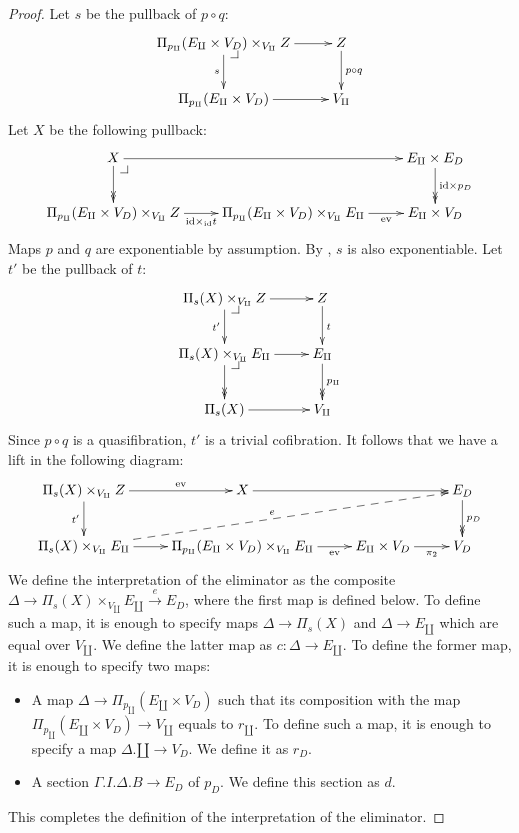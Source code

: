 \documentclass[reqno]{amsart}
\makeatletter
\theoremstyle{definition}
\theoremstyle{remark}
\newcommand{\fs}[1]{\mathrm{#1}}
\newcommand{\id}{\fs{id}}
\numberwithin{figure}{section}
\newcommand{\pb}[1][dr]{\save*!/#1-1.2pc/#1:(-1,1)@^{|-}\restore}
\makeatother
\begin{document}
\begin{proof}
Let $s$ be the pullback of $p \circ q$:
\[ \xymatrix{ \Pi_{p_\amalg}(E_\amalg \times V_D) \times_{V_\amalg} Z \ar[r] \ar[d]_s \pb   & Z \ar[d]^{p \circ q} \\
              \Pi_{p_\amalg}(E_\amalg \times V_D) \ar[r]                                    & V_\amalg
            } \]
Let $X$ be the following pullback:
\[ \xymatrix{ X \ar[rr] \ar@{->>}[d] \pb                                                            &                                                                                   & E_\amalg \times E_D \ar@{->>}[d]^{\id \times p_D} \\
              \Pi_{p_\amalg}(E_\amalg \times V_D) \times_{V_\amalg} Z \ar[r]_-{\id \times_\id t}    & \Pi_{p_\amalg}(E_\amalg \times V_D) \times_{V_\amalg} E_\amalg \ar[r]_-{\fs{ev}}  & E_\amalg \times V_D
            } \]
Maps $p$ and $q$ are exponentiable by assumption.
By \cite[Corollary~2.6]{comp-fact-tor}, $s$ is also exponentiable.
Let $t'$ be the pullback of $t$:
\[ \xymatrix{ \Pi_s(X) \times_{V_\amalg} Z \ar[r] \ar[d]_{t'} \pb           & Z \ar[d]^t                        \\
              \Pi_s(X) \times_{V_\amalg} E_\amalg \ar[r] \ar@{->>}[d] \pb   & E_\amalg \ar@{->>}[d]^{p_\amalg}  \\
              \Pi_s(X) \ar[r]                                               & V_\amalg
            } \]
Since $p \circ q$ is a quasifibration, $t'$ is a trivial cofibration.
It follows that we have a lift in the following diagram:
\[ \xymatrix{ \Pi_s(X) \times_{V_\amalg} Z \ar[r]^-{\fs{ev}} \ar[d]_{t'}    & X \ar[rr]                                                                         &                                       & E_D \ar@{->>}[d]^{p_D} \\
              \Pi_s(X) \times_{V_\amalg} E_\amalg \ar[r] \ar@{-->}[urrr]^e  & \Pi_{p_\amalg}(E_\amalg \times V_D) \times_{V_\amalg} E_\amalg \ar[r]_-{\fs{ev}}  & E_\amalg \times V_D \ar[r]_-{\pi_2}   & V_D
            } \]
We define the interpretation of the eliminator as the composite $\Delta \to \Pi_s(X) \times_{V_\amalg} E_\amalg \xrightarrow{e} E_D$, where the first map is defined below.
To define such a map, it is enough to specify maps $\Delta \to \Pi_s(X)$ and $\Delta \to E_\amalg$ which are equal over $V_\amalg$.
We define the latter map as $c : \Delta \to E_\amalg$.
To define the former map, it is enough to specify two maps:
\begin{itemize}
\item A map $\Delta \to \Pi_{p_\amalg}(E_\amalg \times V_D)$ such that its composition with the map $\Pi_{p_\amalg}(E_\amalg \times V_D) \to V_\amalg$ equals to $r_\amalg$.
To define such a map, it is enough to specify a map $\Delta.\amalg \to V_D$.
We define it as $r_D$.
\item A section $\Gamma.I.\Delta.B \to E_D$ of $p_D$.
We define this section as $d$.
\end{itemize}
This completes the definition of the interpretation of the eliminator.
\end{proof}
\end{document}

